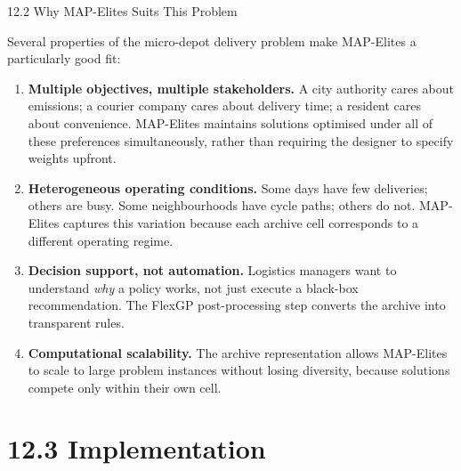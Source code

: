 \documentclass[aspectratio=169,10pt]{beamer}
\begin{document}
\begin{frame}[allowframebreaks]{12.2 Why MAP-Elites Suits This Problem}

Several properties of the micro-depot delivery problem make MAP-Elites
a particularly good fit:

\medskip

\begin{enumerate}
  \item \textbf{Multiple objectives, multiple stakeholders.}
        A city authority cares about emissions; a courier company
        cares about delivery time; a resident cares about
        convenience.
        MAP-Elites maintains solutions optimised under all of these
        preferences simultaneously, rather than requiring the
        designer to specify weights upfront.

  \item \textbf{Heterogeneous operating conditions.}
        Some days have few deliveries; others are busy.
        Some neighbourhoods have cycle paths; others do not.
        MAP-Elites captures this variation because each archive
        cell corresponds to a different operating regime.

  \item \textbf{Decision support, not automation.}
        Logistics managers want to understand \emph{why} a policy
        works, not just execute a black-box recommendation.
        The FlexGP post-processing step converts the archive into
        transparent rules.

  \item \textbf{Computational scalability.}
        The archive representation allows MAP-Elites to scale
        to large problem instances without losing diversity,
        because solutions compete only within their own cell.
\end{enumerate}

\end{frame}

\section{12.3 Implementation}
\end{document}

